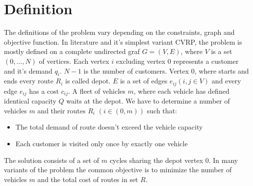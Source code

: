 \documentclass[thesis=B,english]{FITthesis}[2012/10/20]
\begin{document}
    \section{Definition}
    The definitions of the problem vary depending on the constraints, graph and objective function.
    In literature and it's simplest variant CVRP, the problem is mostly defined on a complete undirected graf \(G = (V,E)\), where \(V\) is a set \((0,...,N)\) of vertices. Each vertex \(i\) excluding vertex \(0\) represents a customer and it's demand \(q_{i}\). \(N-1\) is the number of customers. Vertex \(0\), where starts and ends every route \(R_i\) is called depot. \(E\) is a set of edges \(e_{ij} (i,j \in V)\) and every edge \(e_{ij}\) has a cost \(c_{ij}\). A fleet of vehicles \(m\), where each vehicle has defined identical capacity \(Q\) waits at the depot. We have to determine a number of vehicles \(m\) and their routes \(R_i\) \((i \in (0,m))\) such that:
    \begin{itemize}
      \item The total demand of route doesn't exceed the vehicle capacity
      \item Each customer is visited only once by exactly one vehicle
    \end{itemize}
    The solution consists of a set of \(m\) cycles sharing the depot vertex \(0\). In many variants of the problem the common objective is to minimize the number of vehicles \(m\) and the total cost of routes in set \(R\).
\end{document}
